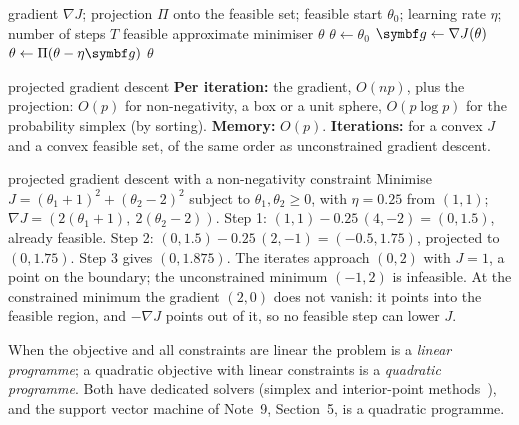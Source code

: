 \documentclass[11pt]{article}
\newcommand{\gvec}{\vect{g}}
\begin{document}
\begin{algorithm}[tb]
\caption{Projected gradient descent}\label{alg:pgd}
\begin{algorithmic}[1]
\Require gradient $\nabla J$; projection $\Pi$ onto the feasible set; feasible start $\theta_0$; learning rate $\eta$; number of steps $T$
\Ensure feasible approximate minimiser $\theta$
  \State $\theta \gets \theta_0$
    \State $\gvec \gets \nabla J(\theta)$ 
    \State $\theta \gets \Pi(\theta - \eta\gvec)$ 
  \EndFor
  \State \Return $\theta$
\EndFunction
\end{algorithmic}
\end{algorithm}

\begin{runtime}{projected gradient descent}
\textbf{Per iteration:} the gradient, $O(np)$, plus the projection: $O(p)$ for non-negativity, a box or a unit sphere,
$O(p\log p)$ for the probability simplex (by sorting). \textbf{Memory:} $O(p)$. \textbf{Iterations:} for a convex $J$
and a convex feasible set, of the same order as unconstrained gradient descent.
\end{runtime}

\begin{worked}{projected gradient descent with a non-negativity constraint}
Minimise $J = (\theta_1 + 1)^2 + (\theta_2 - 2)^2$ subject to $\theta_1, \theta_2 \ge 0$, with $\eta = 0.25$ from
$(1, 1)$; $\nabla J = (2(\theta_1 + 1),\ 2(\theta_2 - 2))$. Step 1: $(1, 1) - 0.25\,(4, -2) = (0, 1.5)$, already
feasible. Step 2: $(0, 1.5) - 0.25\,(2, -1) = (-0.5, 1.75)$, projected to $(0, 1.75)$. Step 3 gives $(0, 1.875)$.
The iterates approach $(0, 2)$ with $J = 1$, a point on the boundary; the unconstrained minimum $(-1, 2)$ is infeasible.
At the constrained minimum the gradient $(2, 0)$ does not vanish: it points into the feasible region, and $-\nabla J$
points out of it, so no feasible step can lower $J$.
\end{worked}

When the objective and all constraints are linear the problem is a \emph{linear programme}; a quadratic objective with
linear constraints is a \emph{quadratic programme}. Both have dedicated solvers (simplex and interior-point
methods~\cite{boyd2004}), and the support vector machine of Note~9, Section~5, is a quadratic programme.
\end{document}
